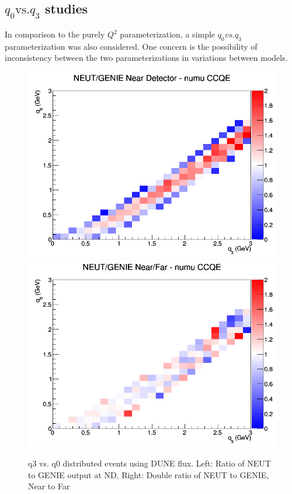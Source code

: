 \documentclass[12pt]{article}
\begin{document}
\subsection{$q_0 \textrm{vs.} q_3$ studies}

In comparison to the purely $Q^2$ parameterization, a simple $q_0 vs. q_3$ parameterization was also considered. One concern is the possibility of inconsistency between the two parameterizations in variations between models. 
\begin{figure}[h]
\includegraphics[width=\linewidth]{q0_q3/nominal/ratios/CCQE_NEUT_GENIE_numu_near_q3_q0.png}
\endminipage
{}
\includegraphics[width=\linewidth]{q0_q3/nominal/ratios/CCQE_NEUT_GENIE_numu_NF_q3_q0.png}
\endminipage
\caption{q3 vs. q0 distributed events using DUNE flux. Left: Ratio of NEUT to GENIE output at ND, Right: Double ratio of NEUT to GENIE, Near to Far}
\end{figure}
\end{document}
